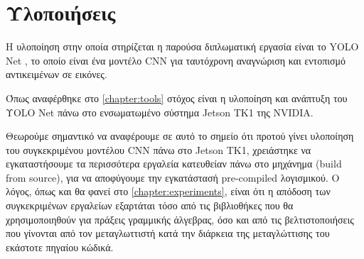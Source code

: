 \chapter{Υλοποιήσεις}
\label{chapter:implementations}

Η υλοποίηση στην οποία στηρίζεται η παρούσα διπλωματική εργασία είναι το
YOLO Net \cite{DBLP:journals/corr/RedmonDGF15}, το οποίο είναι ένα μοντέλο CNN για ταυτόχρονη αναγνώριση και εντοπισμό
αντικειμένων σε εικόνες.

Όπως αναφέρθηκε στο \autoref{chapter:tools} στόχος είναι η υλοποίηση και ανάπτυξη
του ΥΟLO Net πάνω στο ενσωματωμένο σύστημα Jetson TK1 της NVIDIA.

Θεωρούμε σημαντικό να αναφέρουμε σε αυτό το σημείο ότι προτού γίνει υλοποίηση
του συγκεκριμένου μοντέλου CNN πάνω στο Jetson TK1, χρειάστηκε να εγκαταστήσουμε
τα περισσότερα εργαλεία κατευθείαν πάνω στο μηχάνημα (build from source), για να αποφύγουμε
την εγκατάστασή pre-compiled λογισμικού. Ο λόγος, όπως και θα φανεί στο \autoref{chapter:experiments},
είναι ότι η απόδοση των συγκεκριμένων εργαλείων εξαρτάται τόσο από τις
βιβλιοθήκες που θα χρησιμοποιηθούν για πράξεις γραμμικής άλγεβρας,
όσο και από τις βελτιστοποιήσεις που γίνονται από τον μεταγλωττιστή κατά την
διάρκεια της μεταγλώττισης του εκάστοτε πηγαίου κώδικά.



